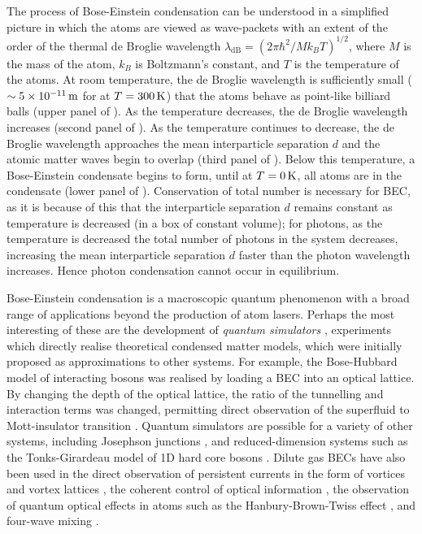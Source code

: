 The process of Bose-Einstein condensation can be understood in a simplified picture in which the atoms are viewed as wave-packets with an extent of the order of the thermal de Broglie wavelength $\lambda_\text{dB} = (2 \pi \hbar^2 / M k_B T)^{1/2}$, where $M$ is the mass of the atom, $k_B$ is Boltzmann's constant, and $T$ is the temperature of the atoms.  At room temperature, the de Broglie wavelength is sufficiently small ($\sim 5\times\unit[10^{-11}]{m}$ for  at $T=\unit[300]{K}$) that the atoms behave as point-like billiard balls (upper panel of ).  As the temperature decreases, the de Broglie wavelength increases (second panel of ).  As the temperature continues to decrease, the de Broglie wavelength approaches the mean interparticle separation $d$ and the atomic matter waves begin to overlap (third panel of ).  Below this temperature, a Bose-Einstein condensate begins to form, until at $T=\unit[0]{K}$, all atoms are in the condensate (lower panel of ).  Conservation of total number is necessary for BEC, as it is because of this that the interparticle separation $d$ remains constant as temperature is decreased (in a box of constant volume); for photons, as the temperature is decreased the total number of photons in the system decreases, increasing the mean interparticle separation $d$ faster than the photon wavelength increases.  Hence photon condensation cannot occur in equilibrium.

Bose-Einstein condensation is a macroscopic quantum phenomenon with a broad range of applications beyond the production of atom lasers.  Perhaps the most interesting of these are the development of \emph{quantum simulators} \citep{Lewenstein:2007,Buluta:2009}, experiments which directly realise theoretical condensed matter models, which were initially proposed as approximations to other systems.  For example, the Bose-Hubbard model \citep{Fisher:1989} of interacting bosons was realised by loading a BEC into an optical lattice.  By changing the depth of the optical lattice, the ratio of the tunnelling and interaction terms was changed, permitting direct observation of the superfluid to Mott-insulator transition \citep{Greiner:2002lr}.  Quantum simulators are possible for a variety of other systems, including Josephson junctions \citep{Levy:2007vn}, and reduced-dimension systems such as the Tonks-Girardeau model of 1D hard core bosons \citep{Girardeau:1960,Lieb:1963,Paredes:2004}.  Dilute gas BECs have also been used in the direct observation of persistent currents in the form of vortices and vortex lattices \citep{Abo-Shaeer:2001}, the coherent control of optical information \citep{Ginsberg:2007fk}, the observation of quantum optical effects in atoms such as the Hanbury-Brown-Twiss effect \citep{Jeltes:2007fk}, and four-wave mixing \citep{Deng:1999qy}.

